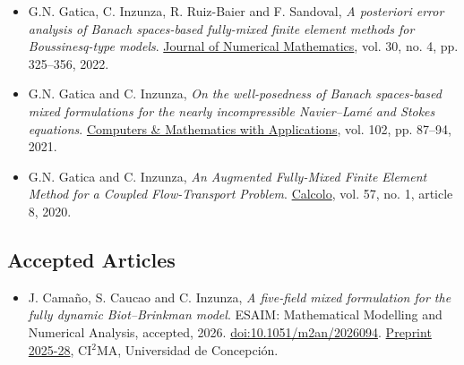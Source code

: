 \documentclass[letterpaper,12pt]{article}
\newcommand{\PubSpace}{\vspace{0.3mm}}
\begin{document}
\begin{itemize}
    \href{https://doi.org/10.1007/s10915-022-01959-9}{Journal of Scientific Computing}, vol. 92, no. 3, article 103, 2022.
\PubSpace
\item {\sc G.N. Gatica, C. Inzunza, R. Ruiz-Baier and F. Sandoval},
    {\it A posteriori error analysis of Banach spaces-based fully-mixed finite element methods for Boussinesq-type models}.
    \href{https://doi.org/10.1515/jnma-2021-0101}{Journal of Numerical Mathematics}, vol. 30, no. 4, pp. 325--356, 2022.
\PubSpace
\item {\sc G.N. Gatica and C. Inzunza},
    {\it On the well-posedness of Banach spaces-based mixed formulations for the nearly incompressible Navier--Lam\'e and Stokes equations}.
    \href{https://doi.org/10.1016/j.camwa.2021.10.004}{Computers \& Mathematics with Applications}, vol. 102, pp. 87--94, 2021.
\PubSpace
\item {\sc G.N. Gatica and C. Inzunza},
    {\it An Augmented Fully-Mixed Finite Element Method for a Coupled Flow-Transport Problem}.
    \href{https://doi.org/10.1007/s10092-020-0355-y}{Calcolo}, vol. 57, no. 1, article 8, 2020.
\end{itemize}

\subsection*{Accepted Articles}
\begin{itemize}
\item {\sc J. Cama\~no, S. Caucao and C. Inzunza},
    {\it A five-field mixed formulation for the fully dynamic Biot--Brinkman model}.
    ESAIM: Mathematical Modelling and Numerical Analysis, accepted, 2026.\newline
    \href{https://doi.org/10.1051/m2an/2026094}{doi:10.1051/m2an/2026094}.
    \href{https://ci2ma.udec.cl/publicaciones/prepublicaciones/prepublicacion.php?id=601}{Preprint 2025-28}, CI$^2$MA, Universidad de Concepci\'on.
\end{itemize}
\end{document}
